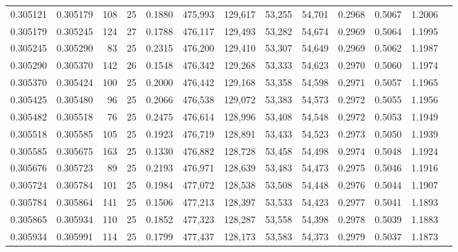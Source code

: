 \begin{tabular}{rrrrrrrrrrrrr}
0.305121 & 0.305179 &   108 &  25 &                                     0.1880 & 475,993 & 129,617 &  53,255 &  54,701 & 0.2968 & 0.5067 & 1.2006 \\
0.305179 & 0.305245 &   124 &  27 &                                     0.1788 & 476,117 & 129,493 &  53,282 &  54,674 & 0.2969 & 0.5064 & 1.1995 \\
0.305245 & 0.305290 &    83 &  25 &                                     0.2315 & 476,200 & 129,410 &  53,307 &  54,649 & 0.2969 & 0.5062 & 1.1987 \\
0.305290 & 0.305370 &   142 &  26 &                                     0.1548 & 476,342 & 129,268 &  53,333 &  54,623 & 0.2970 & 0.5060 & 1.1974 \\
0.305370 & 0.305424 &   100 &  25 &                                     0.2000 & 476,442 & 129,168 &  53,358 &  54,598 & 0.2971 & 0.5057 & 1.1965 \\
0.305425 & 0.305480 &    96 &  25 &                                     0.2066 & 476,538 & 129,072 &  53,383 &  54,573 & 0.2972 & 0.5055 & 1.1956 \\
0.305482 & 0.305518 &    76 &  25 &                                     0.2475 & 476,614 & 128,996 &  53,408 &  54,548 & 0.2972 & 0.5053 & 1.1949 \\
0.305518 & 0.305585 &   105 &  25 &                                     0.1923 & 476,719 & 128,891 &  53,433 &  54,523 & 0.2973 & 0.5050 & 1.1939 \\
0.305585 & 0.305675 &   163 &  25 &                                     0.1330 & 476,882 & 128,728 &  53,458 &  54,498 & 0.2974 & 0.5048 & 1.1924 \\
0.305676 & 0.305723 &    89 &  25 &                                     0.2193 & 476,971 & 128,639 &  53,483 &  54,473 & 0.2975 & 0.5046 & 1.1916 \\
0.305724 & 0.305784 &   101 &  25 &                                     0.1984 & 477,072 & 128,538 &  53,508 &  54,448 & 0.2976 & 0.5044 & 1.1907 \\
0.305784 & 0.305864 &   141 &  25 &                                     0.1506 & 477,213 & 128,397 &  53,533 &  54,423 & 0.2977 & 0.5041 & 1.1893 \\
0.305865 & 0.305934 &   110 &  25 &                                     0.1852 & 477,323 & 128,287 &  53,558 &  54,398 & 0.2978 & 0.5039 & 1.1883 \\
0.305934 & 0.305991 &   114 &  25 &                                     0.1799 & 477,437 & 128,173 &  53,583 &  54,373 & 0.2979 & 0.5037 & 1.1873 \\

\end{tabular}

